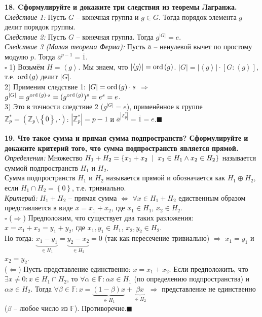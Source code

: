 \documentclass[11pt,a4paper]{article}
\newcommand{\Z}{\mathbb{Z}}
\newcommand{\F}{\mathbb{F}}
\newcommand{\Ord}[1]{\mathrm{ord}\hspace{0.5mm}#1}
\renewcommand{\mid}{\hspace{2mm}\middle|\hspace{2mm}}
\newcommand{\proof}{$\square$ }
\newcommand{\qed}{\hfill$\blacksquare$}
\begin{document}
\textbf{18. Cформулируйте и докажите три следствия из теоремы Лагранжа.\\}
\textit{Следствие 1:} Пусть $G$ -- конечная группа и $g \in G$. Тогда порядок элемента $g$ делит порядок группы.\\
\textit{Следствие 2:} Пусть $G$ -- конечная группа. Тогда $g^{\left\vert G \right\vert} = e$.\\
\textit{Следствие 3 (Малая теорема Ферма):} Пусть $\overline{a}$ -- ненулевой вычет по простому модулю $p$. Тогда $\overline{a}^{p - 1} = \overline{1}$.\\
\proof 1) Возьмём $H = \left\langle g \right\rangle$. Мы знаем, что $\left\vert \left\langle g \right\rangle \right\vert = \Ord{(g)}$. $\left\vert G \right\vert = \left\vert \left\langle g \right\rangle \right\vert \cdot \left[ G : \left\langle g \right\rangle \right]$, т.е. $\Ord{(g)}$ делит $\left\vert G \right\vert$.\\
2) Применим следствие 1: $|G| = \Ord{(g)} \cdot s$ $\Rightarrow$ $g^{\left\vert G \right\vert} = g^{\Ord{(g)} \cdot s} = (g^{\Ord{(g)}})^s = e^s = e$.\\
3) Это в точности следствие 2 ($g^{\left\vert G \right\vert} = e$), применённое к группе $\Z_p^* = \left( \Z_p \setminus \left\{ \overline{0} \right\}, \cdot \right)$: $\left\vert \Z_p^* \right\vert = p - 1$ и $\overline{a}^{\left\vert \Z_p^* \right\vert} = \overline{1} = e$.\qed

\textbf{19. Что такое сумма и прямая сумма подпространств? Сформулируйте и докажите критерий того, что сумма подпространств является прямой.\\}
\textit{Определения:} Множество $H_1 + H_2 = \left\{ x_1 + x_2 \mid x_1 \in H_1 \wedge x_2 \in H_2 \right\}$ называется суммой подпространств $H_1$ и $H_2$.\\
Сумма подпространств $H_1$ и $H_2$ называется прямой и обозначается как $H_1 \oplus H_2$, если $H_1 \cap H_2 = \left\{ 0 \right\}$, т.е. тривиально.\\
\textit{Критерий:} $H_1 + H_2$ -- прямая сумма $\Leftrightarrow$ $\forall x \in H_1 + H_2$ едиственным образом представляется в виде $x = x_1 + x_2$, где $x_1 \in H_1$, $x_2 \in H_2$.\\
\proof ($\Rightarrow$) Предположим, что существует два таких разложения: $x = x_1 + x_2 = y_1 + y_2$, где $x_1, y_1 \in H_1$, $x_2, y_2 \in H_2$.\\
Но тогда: $\underbrace{x_1 - y_1}_{\in H_1} = \underbrace{y_2 - x_2}_{\in H_2} = 0$ (так как пересечение тривиально) $\Rightarrow$ $x_1 = y_1$ и $x_2 = y_2$.\\
($\Leftarrow$) Пусть представление единственно: $x = x_1 + x_2$. Если предположить, что $\exists x \neq 0: x \in H_1 \cap H_2$, то $\forall \alpha \in \F: \alpha x \in H_1$ (по определению подпространства) и $\alpha x \in H_2$. Тогда $\forall \beta \in \F: x = \underbrace{(1 - \beta) x}_{\in H_1} + \underbrace{\beta x}_{\in H_2}$ $\Rightarrow$ представление не единственно ($\beta$ -- любое число из $\F$). Противоречие.\qed
\end{document}
